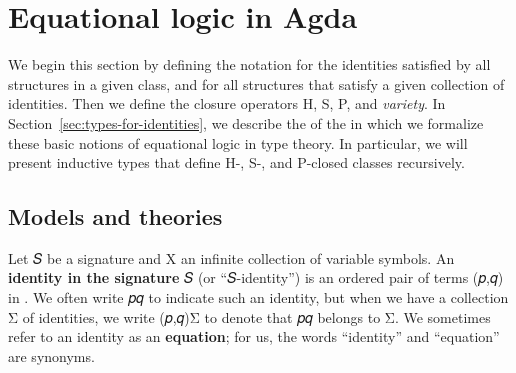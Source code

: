 \documentclass[a4paper,USenglish,cleveref,autoref,thm-restate]{lipics-v2019}
\begin{document}

\section{Equational logic in Agda}\label{sec:equational-logic-in-agda}
We begin this section by defining the notation  for the identities satisfied by all structures in a given class, and  for all structures that satisfy a given collection of identities. Then we define the closure operators \AF H, \AF S, \AF P, and \emph{variety}. In Section~\ref{sec:types-for-identities}, we describe the \closuremodule of the \agdaualib in which we formalize these basic notions of equational logic in type theory. In particular, we will present inductive types that define \AF H-, \AF S-, and \AF P-closed classes recursively.


\subsection{Models and theories}\label{sec:models-and-theories}
Let \AB 𝑆 be a signature and \AB X an infinite collection of variable symbols. An \textbf{identity in the signature} \AB 𝑆 (or ``\AB 𝑆-identity'') is an ordered pair of terms (\AB 𝑝\AS\ASy ,\AS\AB 𝑞) in \TX\AS{}\AS\TX. We often write \AB 𝑝\AS\ASy \Aapprox \AS\AB 𝑞 to indicate such an identity, but when we have a collection \AB Σ of identities, we write (\AB 𝑝\AS\ASy ,\AS\AB 𝑞)\AS\Ain \AS\AB Σ to denote that \AB 𝑝\AS\ASy \Aapprox \AS\AB 𝑞 belongs to \AB Σ.  We sometimes refer to an identity as an \textbf{equation}; for us, the words ``identity'' and ``equation'' are synonyms.
\end{document}
